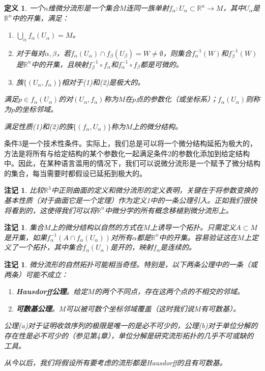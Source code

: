 \documentclass[12pt,a4paper]{ctexbook}
\newtheorem{definition}[theorem]{定义}
\newtheorem{remark}[theorem]{注记}
\begin{document}
\begin{definition}
一个$n$维微分流形是一个集合$M$连同一族单射$f_\alpha:U_\alpha\subset\mathbb{R}^n\to M$，其中$U_\alpha$是$\mathbb{R}^n$中的开集，满足：
\begin{enumerate}
    \item $\bigcup_\alpha f_\alpha(U_\alpha) = M$。
    \item 对于每对$\alpha,\beta$，若$f_\alpha(U_\alpha)\cap f_\beta(U_\beta)=W\neq\emptyset$，则集合$f_\alpha^{-1}(W)$和$f_\beta^{-1}(W)$是$\mathbb{R}^n$中的开集，且映射$f_\beta^{-1}\circ f_\alpha$和$f_\alpha^{-1}\circ f_\beta$都是可微的。
    \item 族$\{(U_\alpha,f_\alpha)\}$相对于(1)和(2)是极大的。
\end{enumerate}

满足$p\in f_\alpha(U_\alpha)$的对$(U_\alpha,f_\alpha)$称为$M$在$p$点的参数化（或坐标系）；$f_\alpha(U_\alpha)$则称为$p$的坐标邻域。

满足性质(1)和(2)的族$\{(f_\alpha,U_\alpha)\}$称为$M$上的微分结构。
\end{definition}

条件3是一个技术性条件。实际上，我们总是可以将一个微分结构延拓为极大的，方法是将所有与给定结构的某个参数化一起满足条件2的参数化添加到给定结构中。因此，在某种语言滥用的情况下，我们可以说微分流形是一个赋予了微分结构的集合，每当需要时都假设已延拓到极大的。

\begin{remark}
比较$\mathbb{R}^3$中正则曲面的定义和微分流形的定义表明，关键在于将参数变换的基本性质（对于曲面它是一个定理）作为定义1中的一条公理引入。正如我们很快将看到的，这使得我们可以将$\mathbb{R}^n$中微分学的所有概念移植到微分流形上。
\end{remark}

\begin{remark}
集合$M$上的微分结构以自然的方式在$M$上诱导一个拓扑。只需定义$A\subset M$是开集，如果$f_\alpha^{-1}(A\cap f_\alpha(U_\alpha))$对所有$\alpha$都是$\mathbb{R}^n$中的开集。容易验证这在$M$上定义了一个拓扑，其中集合$f_\alpha(U_\alpha)$是开的，映射$f_\alpha$是连续的。
\end{remark}

\begin{remark}
微分流形的自然拓扑可能相当奇怪。特别是，以下两条公理中的一条（或两条）可能不成立：
\begin{enumerate}[label=\alph*)]
    \item \textbf{Hausdorff公理}。给定$M$的两个不同点，存在这两个点的不相交的邻域。
    \item \textbf{可数基公理}。$M$可以被可数个坐标邻域覆盖（这时我们说$M$有可数基）。
\end{enumerate}

公理(a)对于证明收敛序列的极限是唯一的是必不可少的，公理(b)对于单位分解的存在性是必不可少的（参见第4章），单位分解是研究流形拓扑的几乎不可或缺的工具。

从今以后，我们将假设所有要考虑的流形都是Hausdorff的且有可数基。
\end{remark}
\end{document}
